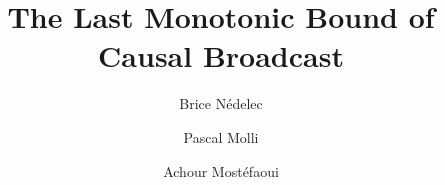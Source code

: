 \documentclass[english,a4paper]{lipics-v2018}
\author{Brice N{\'e}delec}{\affLSNN}{brice.nedelec@univ-nantes.fr}{}{}
\author{Pascal Molli}{\affLSNN}{pascal.molli@univ-nantes.fr}{}{}
\author{Achour Most{\'e}faoui}{\affLSNN}{achour.mostefaoui@univ-nantes.fr}{}{}
\newcommand{\affLSNN}{LS2N, University of Nantes,
   2 rue de la Houssini{\`e}re,
   BP 92208, 44322 Nantes Cedex 3, France}%
\begin{document}
 


\title{The Last Monotonic Bound of Causal Broadcast}





\maketitle









% 




% 
  
\end{document}
